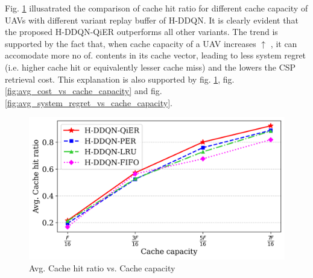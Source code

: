 \documentclass[journal]{IEEEtran}
\begin{document}
Fig. \ref{fig:avg_chr_vs_cache_capacity} illusatrated the comparison of cache hit ratio for different cache capacity of UAVs with different variant replay buffer of H-DDQN. It is clearly evident that the proposed H-DDQN-QiER outperforms all other variants. The trend is supported by the fact that, when cache capacity of a UAV increases $\uparrow$ , it can accomodate more no of. contents in its cache vector, leading to less system regret (i.e. higher cache hit or equivalently lesser cache miss) and the lowers the CSP retrieval cost. This explanation is also supported by fig. \ref{fig:avg_chr_vs_cache_capacity}, fig. \ref{fig:avg_cost_vs_cache_capacity} and fig. \ref{fig:avg_system_regret_vs_cache_capacity}.
\begin{figure}[htbp]
    \centering
    \includegraphics[width=\linewidth]{MinMax Cost Scaled/avg_chr_vs_capacity_linegraph.png}  %
    \caption{Avg. Cache hit ratio vs. Cache capacity}
    \label{fig:avg_chr_vs_cache_capacity}
\end{figure}




\end{document}
